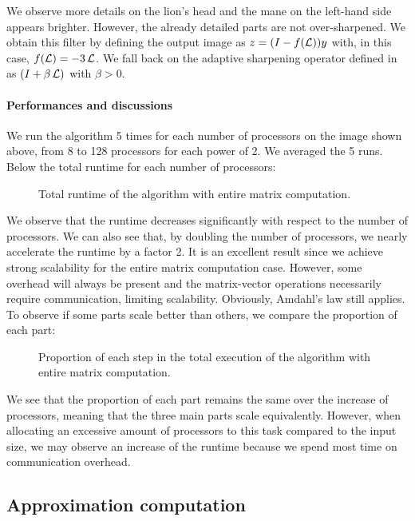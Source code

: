 We observe more details on the lion's head and the mane on the left-hand side appears brighter.
However, the already detailed parts are not over-sharpened.
We obtain this filter by defining the output image as \(z = (I - f(\operatorname{\mathcal{L}}))y\) with, in this case, \(f(\operatorname{\mathcal{L}}) = -3\operatorname{\mathcal{L}}\).
We fall back on the adaptive sharpening operator defined in \cite{siam_slides_2016} as \((I + \beta \operatorname{\mathcal{L}})\) with \(\beta > 0\).

\paragraph{Performances and discussions}
We run the algorithm 5 times for each number of processors on the image shown above, from 8 to 128 processors for each power of 2.
We averaged the 5 runs.
Below the total runtime for each number of processors:
\begin{figure}[H]
  \centering
  
  \caption{Total runtime of the algorithm with entire matrix computation.}
\end{figure}

We observe that the runtime decreases significantly with respect to the number of processors.
We can also see that, by doubling the number of processors, we nearly accelerate the runtime by a factor 2.
It is an excellent result since we achieve strong scalability for the entire matrix computation case.
However, some overhead will always be present and the matrix-vector operations necessarily require communication, limiting scalability.
Obviously, Amdahl's law still applies.
To observe if some parts scale better than others, we compare the proportion of each part:
\begin{figure}[H]
  \centering
  
  \caption{Proportion of each step in the total execution of the algorithm with entire matrix computation.}
\end{figure}

We see that the proportion of each part remains the same over the increase of processors, meaning that the three main parts scale equivalently.
However, when allocating an excessive amount of processors to this task compared to the input size, we may observe an increase of the runtime because we spend most time on communication overhead.

\subsection{Approximation computation}

